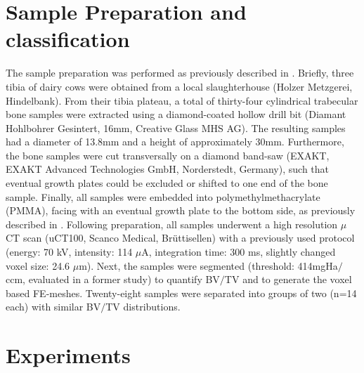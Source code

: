 \documentclass[12pt, a4paper, twoside]{report}
\begin{document}
\section{Sample Preparation and classification}
%
The sample preparation was performed as previously described in \cite{Voumard2015}. Briefly, three tibia of dairy cows were obtained from a local slaughterhouse (Holzer Metzgerei, Hindelbank). From their tibia plateau, a total of thirty-four cylindrical trabecular bone samples were extracted using a diamond-coated hollow drill bit (Diamant Hohlbohrer Gesintert,
16mm, Creative Glass MHS AG). The resulting samples had a diameter of 13.8mm and a height of approximately 30mm. Furthermore, the bone samples were cut transversally on a diamond band-saw (EXAKT, EXAKT Advanced Technologies GmbH, Norderstedt, Germany), such that eventual growth plates could be excluded or shifted to one end of the bone sample. Finally, all samples were embedded into polymethylmethacrylate (PMMA), facing with an eventual growth plate to the bottom side, as previously described in \cite{Voumard2015}.  Following preparation, all samples underwent a high resolution $\mu$CT scan (uCT100, Scanco Medical, Br\"{u}ttisellen) with a previously used protocol (energy: 70 kV, intensity: 114 $\mu$A, integration time: 300 ms, slightly changed voxel size: 24.6 $\mu$m). Next, the samples were segmented (threshold: 414mgHa$/$ccm, evaluated in a former study) to quantify BV$/$TV and to generate the voxel based FE-meshes. Twenty-eight samples were separated into groups of two (n=14 each) with similar BV$/$TV distributions. 
%
\section{Experiments}
%
%
\end{document}
